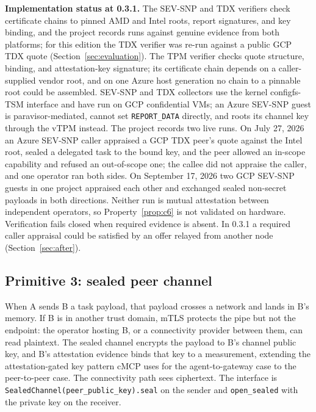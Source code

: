 \textbf{Implementation status at 0.3.1.} The SEV-SNP and TDX verifiers check certificate chains
to pinned AMD and Intel roots, report signatures, and key binding, and the project records runs
against genuine evidence from both platforms; for this edition the TDX verifier was re-run
against a public GCP TDX quote (Section~\ref{sec:evaluation}). The TPM verifier checks quote
structure, binding, and attestation-key signature; its certificate chain depends on a
caller-supplied vendor root, and on one Azure host generation no chain to a pinnable root could
be assembled. SEV-SNP and TDX collectors use the kernel configfs-TSM interface and have run on
GCP confidential VMs; an Azure SEV-SNP guest is paravisor-mediated, cannot set
\texttt{REPORT\_DATA} directly, and roots its channel key through the vTPM instead. The project
records two live runs. On July 27, 2026 an Azure SEV-SNP caller appraised a GCP TDX peer's quote
against the Intel root, sealed a delegated task to the bound key, and the peer allowed an
in-scope capability and refused an out-of-scope one; the callee did not appraise the caller, and
one operator ran both sides. On September 17, 2026 two GCP SEV-SNP guests in one project
appraised each other and exchanged sealed non-secret payloads in both directions. Neither run is
mutual attestation between independent operators, so Property~\ref{prop:c6} is not validated on
hardware. Verification fails closed when required evidence is absent. In 0.3.1 a required caller
appraisal could be satisfied by an offer relayed from another node (Section~\ref{sec:after}).

\subsection{Primitive 3: sealed peer channel}\label{subsec:sealed}

When A sends B a task payload, that payload crosses a network and lands in B's memory. If B is
in another trust domain, mTLS protects the pipe but not the endpoint: the operator hosting B,
or a connectivity provider between them, can read plaintext. The sealed channel encrypts the
payload to B's channel public key, and B's attestation evidence binds that key to a
measurement, extending the attestation-gated key pattern cMCP uses for the agent-to-gateway
case to the peer-to-peer case. The connectivity path sees ciphertext. The interface is
\texttt{SealedChannel(peer\_public\_key).seal} on the sender and \texttt{open\_sealed} with the
private key on the receiver.

